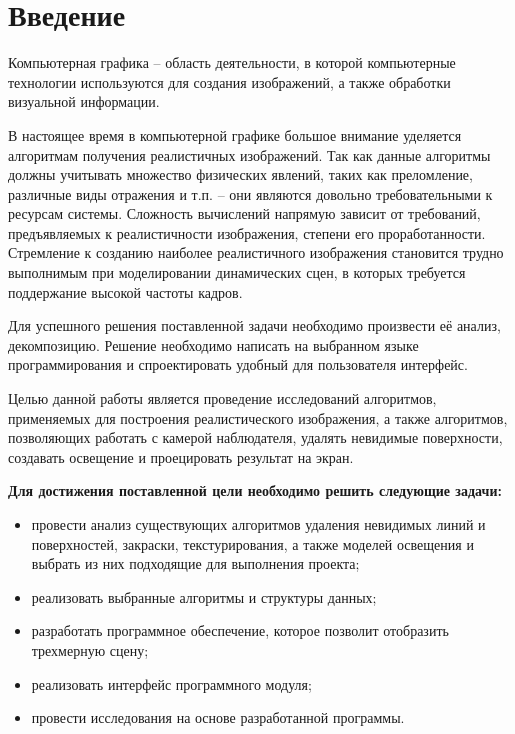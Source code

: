 \documentclass[12pt,a4paper,oneside]{report}
\begin{document}
	\chapter*{Введение}
	
	\quad Компьютерная графика -- область деятельности, в которой компьютерные технологии используются для создания изображений, а также обработки визуальной информации. 
	
	 В настоящее время в компьютерной графике большое внимание уделяется алгоритмам получения реалистичных изображений. Так как данные алгоритмы должны учитывать множество физических явлений, таких как преломление, различные виды отражения и т.п. -- они являются довольно требовательными к ресурсам системы. Сложность вычислений напрямую зависит от требований, предъявляемых к реалистичности изображения, степени его проработанности. Стремление к созданию наиболее реалистичного изображения становится трудно выполнимым при моделировании динамических сцен, в которых требуется поддержание высокой частоты кадров. 
	
	
	 Для успешного решения поставленной задачи необходимо произвести её анализ, декомпозицию. Решение необходимо написать на выбранном языке программирования и спроектировать удобный для пользователя интерфейс. 
	
	 Целью данной работы является проведение исследований алгоритмов, применяемых для построения реалистического изображения, а также алгоритмов, позволяющих работать с камерой наблюдателя, удалять невидимые поверхности, создавать освещение и проецировать результат на экран.
	
	 \textbf{Для достижения поставленной цели необходимо решить следующие задачи: } 
	
	\begin{itemize}
		\item провести анализ существующих алгоритмов удаления невидимых линий и поверхностей, закраски, текстурирования, а также моделей освещения и выбрать из них подходящие для выполнения проекта;
		\item реализовать выбранные алгоритмы и структуры данных;
		\item разработать программное обеспечение, которое позволит отобразить трехмерную сцену;
		\item реализовать интерфейс программного модуля;
		\item провести исследования на основе разработанной программы. 
		
	\end{itemize}
\end{document}
